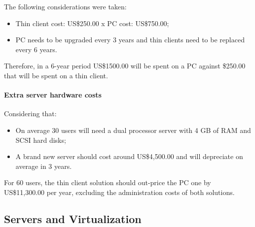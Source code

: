                 The following considerations were taken:
                \begin{itemize}
                    \item Thin client cost: US\$250.00 x PC cost: US\$750.00;
                    \item PC needs to be upgraded every 3 years and thin clients need to be replaced every 6 years.
                \end{itemize}
                Therefore, in a 6-year period US\$1500.00 will be spent on a PC against \$250.00 that will be spent on a thin client.

            \paragraph*{Extra server hardware costs}
                Considering that:
                \begin{itemize}
                    \item On average 30 users will need a dual processor server with 4 GB of RAM and SCSI hard disks;
                    \item A brand new server should cost around US\$4,500.00 and will depreciate on average in 3 years.
                \end{itemize}
                For 60 users, the thin client solution should out-price the PC one by US\$11,300.00 per year, excluding the administration costs of both solutions.

        \subsection{Servers and Virtualization} \label{sec2:servers_virtualization}
                        
